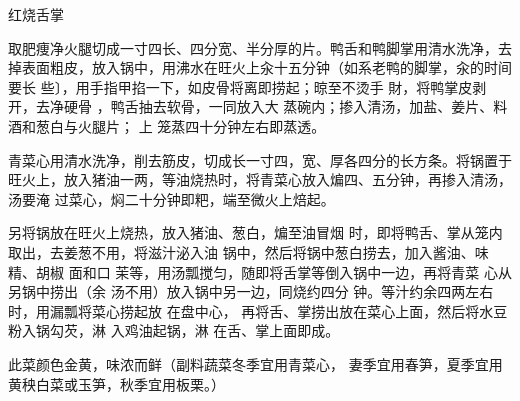 \begin{recipe}{红烧舌掌}

\ingredients


\cooking

\step 取肥痩净火腿切成一寸四长、四分宽、半分厚的片。鸭舌和鸭脚掌用清水洗净，去
掉表面粗皮，放入锅中，用沸水在旺火上汆十五分钟（如系老鸭的脚掌，汆的时间要长
些〕，用手指甲掐一下，如皮骨将离即捞起；晾至不烫手 財，将鸭掌皮剥开，去净硬骨
，鸭舌抽去软骨，一同放入大 蒸碗内；掺入清汤，加盐、姜片、料酒和葱白与火腿片；
上 笼蒸四十分钟左右即蒸透。

\step 青菜心用清水洗净，削去筋皮，切成长一寸四，宽、厚各四分的长方条。将锅置于
旺火上，放入猪油一两，等油烧热时，将青菜心放入煸四、五分钟，再掺入清汤，汤要淹
过菜心，焖二十分钟即粑，端至微火上焙起。

\step 另将锅放在旺火上烧热，放入猪油、葱白，煸至油冒烟 时，即将鸭舌、掌从笼内
取出，去姜葱不用，将滋汁泌入油 锅中，然后将锅中葱白捞去，加入酱油、味精、胡椒
面和口 茉等，用汤瓢搅匀，随即将舌掌等倒入锅中一边，再将青菜 心从另锅中捞出（余
汤不用）放入锅中另一边，同烧约四分 钟。等汁约余四两左右时，用漏瓢将菜心捞起放
在盘中心， 再将舌、掌捞出放在菜心上面，然后将水豆粉入锅勾芡，淋 入鸡油起锅，淋
在舌、掌上面即成。

\notes

此菜颜色金黄，味浓而鲜（副料蔬菜冬季宜用青菜心， 妻季宜用春笋，夏季宜用黄秧白菜或玉笋，秋季宜用板栗。）

\end{recipe}

